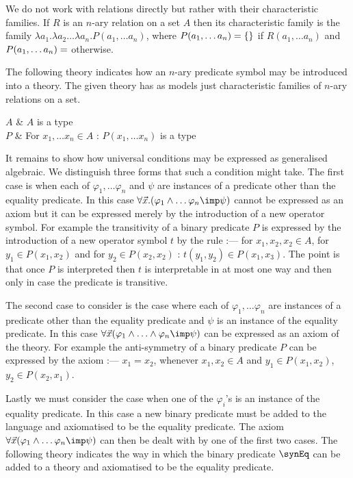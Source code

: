 We do not work with relations directly but rather with their characteristic families.
%
If $R$ is an $n$-ary relation on a set $A$ then its characteristic family is the family $\lambda a_1. \lambda a_2 \ldots \lambda a_n . P(a_1, \ldots a_n)$, where $P(a_1,\ldots a_n) = \{ \empty \}$ if $R(a_1,\ldots a_n)$ and $P(a_1,\ldots a_n) = \empty$ otherwise.

The following theory indicates how an $n$-ary predicate symbol may be introduced into a theory.
%
The given theory has as models just characteristic families of $n$-ary relations on a set.

\begin{theoryspec}
  $A$ & $A$ is a type \\
  $P$ & For $x_1, \ldots x_n \in A$ : $P(x_1,\ldots x_n)$ is a type \\
  \oneaxiom
\end{theoryspec}

It remains to show how universal conditions may be expressed as generalised algebraic.
%
We distinguish three forms that such a condition might take.
%
The first case is when each of $\varphi_1, \ldots \varphi_n$ and $\psi$ are instances of a predicate other than the equality predicate.
%
In this case $\forall \vec x.(\varphi_1 \land \ldots \varphi_n \imp \psi)$ cannot be expressed as an axiom but it can be expressed merely by the introduction of a new operator symbol.
%
For example the transitivity of a binary predicate $P$ is expressed by the introduction of a new operator symbol $t$ by the rule :---  for $x_1,x_2,x_2 \in A$, for $y_1 \in P(x_1,x_2)$ and for $y_2 \in P(x_2,x_2)$ : $t(y_1,y_2) \in P(x_1,x_3)$.
%
The point is that once $P$ is interpreted then $t$ is interpretable in at most one way and then only in case the predicate is transitive.

The second case to consider is the case where each of $\varphi_1, \ldots \varphi_n$ are instances of a predicate other than the equality predicate and $\psi$ is an instance of the equality predicate.
%
In this case $\forall \vec x (\varphi_1 \land \ldots \land \varphi_n \imp \psi)$ can be expressed as an axiom of the theory.
%
For example the anti-symmetry of a binary predicate $P$ can be expressed by the axiom :--- $x_1 = x_2$, whenever $x_1, x_2 \in A$ and $y_1 \in P(x_1,x_2)$, $y_2 \in P(x_2,x_1)$.

Lastly we must consider the case when one of the $\varphi_i$'s is an instance of the equality predicate.
%
In this case a new binary predicate must be added to the language and axiomatised to be the equality predicate.
%
The axiom $\forall \vec x (\varphi_1 \land \ldots \varphi_n \imp \psi)$ can then be dealt with by one of the first two cases.
%
The following theory indicates the way in which the binary predicate $\synEq$ can be added to a theory and axiomatised to be the equality predicate.

